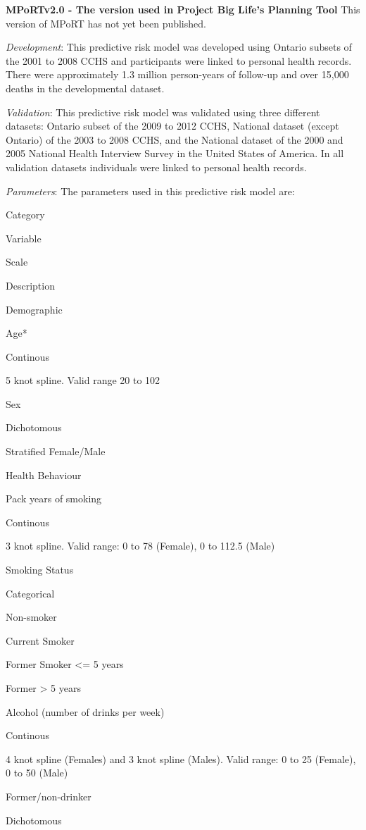 \documentclass[]{book}
\begin{document}
\textbf{MPoRTv2.0 - The version used in Project Big Life's Planning
Tool} This version of MPoRT has not yet been published.

\emph{Development}: This predictive risk model was developed using
Ontario subsets of the 2001 to 2008 CCHS and participants were linked to
personal health records. There were approximately 1.3 million
person-years of follow-up and over 15,000 deaths in the developmental
dataset.

\emph{Validation}: This predictive risk model was validated using three
different datasets: Ontario subset of the 2009 to 2012 CCHS, National
dataset (except Ontario) of the 2003 to 2008 CCHS, and the National
dataset of the 2000 and 2005 National Health Interview Survey in the
United States of America. In all validation datasets individuals were
linked to personal health records.

\emph{Parameters}: The parameters used in this predictive risk model
are:

Category

Variable

Scale

Description

Demographic

Age*

Continous

5 knot spline. Valid range 20 to 102

Sex

Dichotomous

Stratified Female/Male

Health Behaviour

Pack years of smoking

Continous

3 knot spline. Valid range: 0 to 78 (Female), 0 to 112.5 (Male)

Smoking Status

Categorical

Non-smoker

Current Smoker

Former Smoker \textless{}= 5 years

Former \textgreater{} 5 years

Alcohol (number of drinks per week)

Continous

4 knot spline (Females) and 3 knot spline (Males). Valid range: 0 to 25
(Female), 0 to 50 (Male)

Former/non-drinker

Dichotomous
\end{document}
